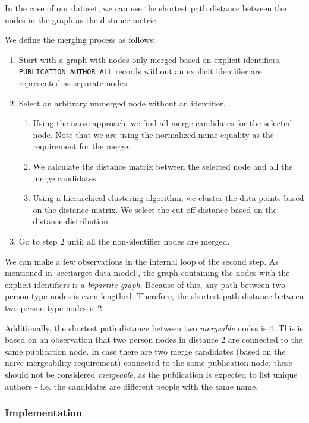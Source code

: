 In the case of our dataset, we can use the shortest path distance between the nodes in the graph as the distance metric.

We define the merging process as follows:

\begin{enumerate}
    \item Start with a graph with nodes only merged based on explicit identifiers. \texttt{PUBLICATION\_AUTHOR\_ALL} records without an explicit identifier are represented as separate nodes.
    \item Select an arbitrary unmerged node without an identifier.
    \begin{enumerate}
        \item Using the \hyperref[sec:naive-approach]{naïve approach}, we find all merge candidates for the selected node. Note that we are using the normalized name equality as the requirement for the merge.
        \item We calculate the distance matrix between the selected node and all the merge candidates.
        \item Using a hierarchical clustering algorithm, we cluster the data points based on the distance matrix. We select the cut-off distance based on the distance distribution.
    \end{enumerate}
    \item Go to step 2 until all the non-identifier nodes are merged.
\end{enumerate}

We can make a few observations in the internal loop of the second step.
As mentioned in \ref{sec:target-data-model}, the graph containing the nodes with the explicit identifiers is a \textit{bipartite graph}.
Because of this, any path between two person-type nodes is even-lengthed.
Therefore, the shortest path distance between two person-type nodes is 2.

Additionally, the shortest path distance between two \textit{mergeable} nodes is 4.
This is based on an observation that two person nodes in distance 2 are connected to the same publication node.
In case there are two merge candidates (based on the naïve mergeability requirement) connected to the same publication node,
these should not be considered \textit{mergeable}, as the publication is expected to list unique authors - i.e. the candidates are
different people with the same name.

\subsubsection{Implementation}

